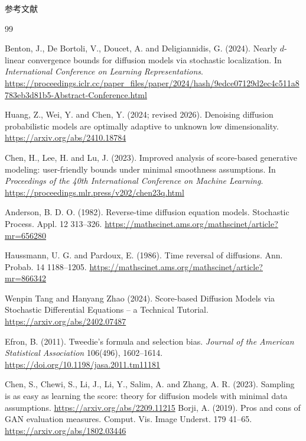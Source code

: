 \documentclass[11pt]{beamer}
\theoremstyle{plain}
\theoremstyle{definition}
\begin{document}
    \begin{frame}[allowframebreaks]{参考文献}
    \begin{thebibliography}{99}

      Benton, J., De Bortoli, V., Doucet, A. and Deligiannidis, G. (2024).
      Nearly $d$-linear convergence bounds for diffusion models via stochastic localization.
      In \textit{International Conference on Learning Representations}.
      \url{https://proceedings.iclr.cc/paper_files/paper/2024/hash/9edce07129d2ec4c511a8783eb3d81b5-Abstract-Conference.html}

      Huang, Z., Wei, Y. and Chen, Y. (2024; revised 2026).
      Denoising diffusion probabilistic models are optimally adaptive to unknown low dimensionality.
      \url{https://arxiv.org/abs/2410.18784}

      
      Chen, H., Lee, H. and Lu, J. (2023).
      Improved analysis of score-based generative modeling: user-friendly bounds under minimal smoothness assumptions.
      In \textit{Proceedings of the 40th International Conference on Machine Learning}.
      \url{https://proceedings.mlr.press/v202/chen23q.html}
    
    Anderson, B. D. O. (1982).
    Reverse-time diffusion equation models.
    Stochastic Process. Appl. 12 313–326.
    \url{https://mathscinet.ams.org/mathscinet/article?mr=656280}
    
    Haussmann, U. G. and Pardoux, E. (1986).
    Time reversal of diffusions.
    Ann. Probab. 14 1188–1205.
    \url{https://mathscinet.ams.org/mathscinet/article?mr=866342}
    
    Wenpin Tang and Hanyang Zhao (2024).
    Score-based Diffusion Models via Stochastic Differential Equations -- a Technical Tutorial.
    \url{https://arxiv.org/abs/2402.07487}

    Efron, B. (2011).
    Tweedie's formula and selection bias.
    \textit{Journal of the American Statistical Association}
    106(496), 1602--1614.
    \url{https://doi.org/10.1198/jasa.2011.tm11181}
    
    Chen, S., Chewi, S., Li, J., Li, Y., Salim, A. and Zhang, A. R. (2023).
    Sampling is as easy as learning the score: theory for diffusion models with minimal data assumptions.
    \url{https://arxiv.org/abs/2209.11215}
    Borji, A. (2019). Pros and cons of GAN evaluation measures. Comput.
    Vis. Image Underst. 179 41–65.
    \url{https://arxiv.org/abs/1802.03446}


\end{thebibliography}
\end{frame}
\end{document}

